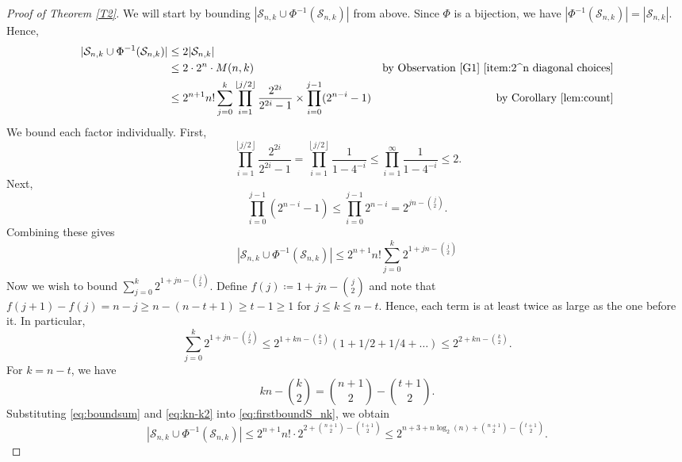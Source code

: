 \documentclass[a4paper, 12pt, reqno]{amsart}
\numberwithin{equation}{section}
\theoremstyle{plain}
\theoremstyle{remark}
\theoremstyle{definition}
\begin{document}
\begin{proof}[Proof of Theorem \ref{T2}]
    We will start by bounding $ |{{\mathcal{S}_{n, k} \cup \Phi^{-1}(\mathcal{S}_{n, k})}}|$ from above. Since $\Phi$ is a bijection, we have $|\Phi^{-1}(\mathcal{S}_{n, k})| = |\mathcal{S}_{n, k} |$. 
    Hence,
    \begin{align*}
        |{\mathcal{S}_{n, k} \cup \Phi^{-1}(\mathcal{S}_{n, k})} | &\leq 2|\mathcal{S}_{n,k}| 
        \\ &\le  2\cdot 2^n \cdot M(n,k) & \text{by Observation \ref{G1} \eqref{item:2^n diagonal choices}}
        \\ &\le 2^{n+1} n!  \sum_{j=0}^{k} \prod_{i=1}^{\left \lfloor{j/2}\right \rfloor } \frac{2^{2i}}{2^{2i}-1} \times \prod_{i=0}^{j-1} (2^{n-i}-1) & \text{by Corollary \ref{lem:count}}
    \end{align*}
    We bound each factor individually. First,
    \begin{equation*}
        \prod_{i=1}^{\left \lfloor{j/2}\right \rfloor } \frac{2^{2i}}{2^{2i}-1} = \prod_{i=1}^{\left \lfloor{j/2}\right \rfloor }\frac{1}{1-4^{-i}} \le  \prod_{i=1}^{\infty}\frac{1}{1-4^{-i}} \leq 2.
    \end{equation*}
    Next,
    \begin{equation*}
        \prod_{i=0}^{j-1} (2^{n-i}-1) \leq \prod_{i=0}^{j-1} 2^{n-i} = 2^{jn - \binom{j}{2}}.
    \end{equation*}
    Combining these gives
    \begin{equation}\label{eq:firstboundS_nk}
        |{\mathcal{S}_{n, k} \cup \Phi^{-1}(\mathcal{S}_{n, k})} | \leq 2^{n+1} n! \sum_{j=0}^{k} 2^{1+jn - \binom{j}{2}}  
    \end{equation}
     Now we wish to bound $ \sum_{j=0}^{k} 2^{1+jn - \binom{j}{2}}$.
    Define $f(j) \coloneqq 1+jn- \binom{j}{2}$ and note that $f(j+1) - f(j) = n-j \geq n-(n-t+1) \geq t-1 \geq 1$ for $j \le k \le n-t$. Hence, each term is at least twice as large as the one before it. In particular,
    \begin{equation}\label{eq:boundsum}
        \sum_{j=0}^{k} 2^{1+jn - \binom{j}{2}} \leq 2^{1+kn - \binom{k}{2}}(1+ 1/2 + 1/4 + \dots) \leq 2^{2+kn - \binom{k}{2}}.
    \end{equation}
    For $k = n-t$, we have
    \begin{equation}\label{eq:kn-k2}
        kn-\binom{k}{2} = \binom{n+1}{2} - \binom{t+1}{2}.
    \end{equation}
    Substituting \eqref{eq:boundsum} and \eqref{eq:kn-k2} into \eqref{eq:firstboundS_nk}, we obtain
    \begin{equation*}
         |{\mathcal{S}_{n, k} \cup \Phi^{-1}(\mathcal{S}_{n, k})} | \leq 2^{n+1} n! \cdot 2^{2 + \binom{n+1}{2} - \binom{t+1}{2}} \leq  2^{n+3 +n\log_2(n) + \binom{n+1}{2}-\binom{t+1}{2}}.
    \end{equation*}
   

\end{proof}
\end{document}
